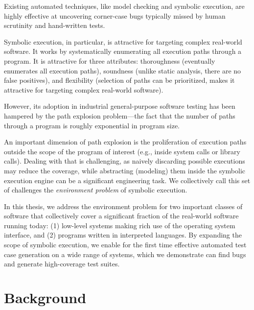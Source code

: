 
Existing automated techniques, like model checking and symbolic execution, are highly effective at uncovering corner-case bugs typically missed by human scrutinity and hand-written tests.

Symbolic execution, in particular, is attractive for targeting complex real-world software. It works by systematically enumerating all execution paths through a program.  It is attractive for three attributes: thoroughness (eventually enumerates all execution paths), soundness (unlike static analysis, there are no false positives), and flexibility (selection of paths can be prioritized, makes it attractive for targeting complex real-world software).

However, its adoption in industrial general-purpose software testing has been hampered by the path explosion problem---the fact that the number of paths through a program is roughly exponential in program size.

An important dimension of path explosion is the proliferation of execution paths outside the scope of the program of interest (e.g., inside system calls or library calls).  Dealing with that is challenging, as naively discarding possible executions may reduce the coverage, while abstracting (modeling) them inside the symbolic execution engine can be a significant engineering task.  We collectively call this set of challenges the \emph{environment problem} of symbolic execution.

In this thesis, we address the environment problem for two important classes of software that collectively cover a significant fraction of the real-world software running today: (1) low-level systems making rich use of the operating system interface, and (2) programs written in interpreted languages.  By expanding the scope of symbolic execution, we enable for the first time effective automated test case generation on a wide range of systems, which we demonstrate can find bugs and generate high-coverage test suites.


\section{Background}


